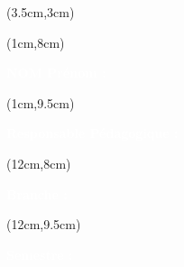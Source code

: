 \begin{titlepage}
    \thispagestyle{empty}

    

    \begin{textblock*}{14cm}(3.5cm,3cm)
        \begin{LARGE}
            \makeatletter
            \justifying

            \begin{center}
                \textbf{\textcolor{white}{\titletext}}
            \end{center}

            \makeatother
        \end{LARGE}
    \end{textblock*}

    \begin{textblock*}{10cm}(1cm,8cm)
        \begin{flushleft}
            \large
            \textbf{\textcolor{white}{NOM Prénom :}}
            \\
            \textbf{\textcolor{white}{\theauthor}}
        \end{flushleft}
    \end{textblock*}

    \begin{textblock*}{10cm}(1cm,9.5cm)
        \begin{flushleft}
            \large
            \textbf{\textcolor{white}{Responsable Pédagogique :}}
            \\
            \textbf{\textcolor{white}{\theRPeda}}
        \end{flushleft}
    \end{textblock*}


    \begin{textblock*}{10cm}(12cm,8cm)
        \begin{flushleft}
            \large
            \textbf{\textcolor{white}{Branche :}}
            \\
            \textcolor{white}{\theUE}
        \end{flushleft}
    \end{textblock*}

    \begin{textblock*}{10cm}(12cm,9.5cm)
        \begin{flushleft}
            \large
            \textbf{\textcolor{white}{Semestre :}}
            \\
            \textcolor{white}{\theSemestre}
        \end{flushleft}
    \end{textblock*}


\end{titlepage}
